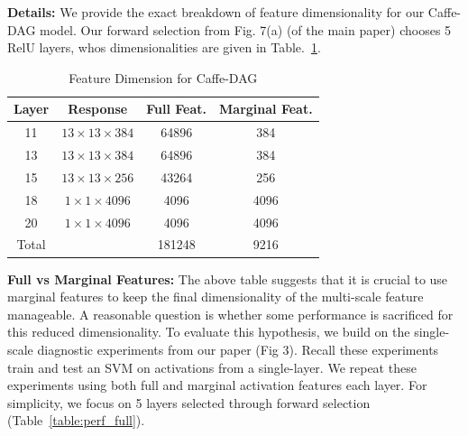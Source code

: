 \documentclass[10pt,twocolumn,letterpaper]{article}
\begin{document}
{\bf Details:} We provide the exact breakdown of feature dimensionality for our Caffe-DAG model. Our forward selection from  Fig. 7(a) (of the main paper) chooses 5 RelU layers, whos dimensionalities are given in Table.~\ref{table:feat_dim}.

\begin{table}[htbp]
\begin{center}
\begin{tabular}{|c|c|c|c|}
\hline
Layer & Response &  Full Feat.& Marginal Feat.\\
\hline
11 & $13\times 13 \times 384$ & 64896 & 384 \\
13 & $13\times 13 \times 384$ & 64896 & 384 \\
15 & $13\times 13 \times 256$ & 43264 & 256 \\
18 & $1\times 1 \times 4096$ & 4096 & 4096 \\
20 & $1\times 1 \times 4096$ & 4096 & 4096 \\
\hline
Total& & 181248 & 9216\\
\hline
\end{tabular}
\end{center}
\caption{Feature Dimension for Caffe-DAG}
\label{table:feat_dim}
\end{table}



{\bf Full vs Marginal Features:} The above table suggests that it is crucial to use marginal features to keep the final dimensionality of the multi-scale feature manageable. A reasonable question is whether some performance is sacrificed for this reduced dimensionality. To evaluate this hypothesis, we build on the single-scale diagnostic experiments from our paper (Fig 3). Recall these experiments train and test an SVM on activations from a single-layer. We repeat these experiments using both full and marginal activation features each layer. For simplicity, we focus on 5 layers selected through forward selection (Table~\ref{table:perf_full}).

\end{document}

